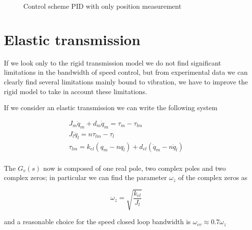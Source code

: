 \begin{figure}
\centering
{}
\caption{Control scheme PID with only position measurement}
\label{fig:rigid_control_position_only_pid}
\end{figure}

\section{Elastic transmission}

If we look only to the rigid transmission model we do not find significant limitations in the bandwidth of speed control, but from experimental data we can clearly find several limitations mainly bound to vibration, we have to improve the rigid model to take in account these limitations.

If we consider an elastic transmission we can write the following system

\begin{gather*}
    J_m\ddot{q}_m + d_m \dot{q}_m = \tau_m - \tau_{lm}\\
    J_l\ddot{q}_l = n \tau_{lm} - \tau_l\\
    \tau_{lm} = k_{el}(q_m - n q_l) + d_{el}(\dot{q}_m - n \dot{q}_l)\\
\end{gather*}

The $G_v(s)$ now is composed of one real pole, two complex poles and two complex zeros;
in particular we can find the parameter $\omega_z$ of the complex zeros as

\[\omega_z = \sqrt{\frac{k_{el}}{J_l}}\]

and a reasonable choice for the speed closed loop bandwidth is $\omega_{cv} \approx 0.7 \omega_z$
